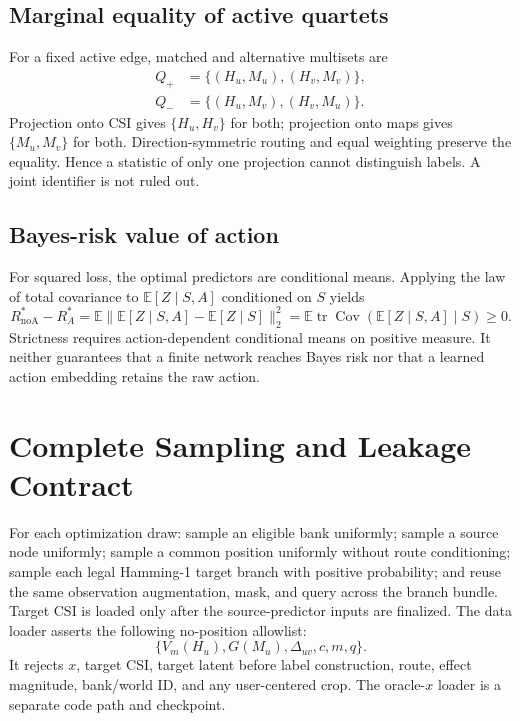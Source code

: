 \documentclass{article}
\newcommand{\csi}{H}
\newcommand{\map}{M}
\newcommand{\E}{\mathbb{E}}
\begin{document}
\subsection{Marginal equality of active quartets}
For a fixed active edge, matched and alternative multisets are
\begin{align*}
Q_+&=\{(\csi_u,\map_u),(\csi_v,\map_v)\},\\
Q_-&=\{(\csi_u,\map_v),(\csi_v,\map_u)\}.
\end{align*}
Projection onto CSI gives $\{\csi_u,\csi_v\}$ for both; projection onto maps
gives $\{\map_u,\map_v\}$ for both.  Direction-symmetric routing and equal
weighting preserve the equality.  Hence a statistic of only one projection
cannot distinguish labels.  A joint identifier is not ruled out.

\subsection{Bayes-risk value of action}
For squared loss, the optimal predictors are conditional means.  Applying the
law of total covariance to $\E[Z\mid S,A]$ conditioned on $S$ yields
\begin{equation*}
 R_{\mathrm{noA}}^*-R_A^*
 =\E\|\E[Z\mid S,A]-\E[Z\mid S]\|_2^2
 =\E\operatorname{tr}\operatorname{Cov}(\E[Z\mid S,A]\mid S)\ge0.
\end{equation*}
Strictness requires action-dependent conditional means on positive measure.
It neither guarantees that a finite network reaches Bayes risk nor that a
learned action embedding retains the raw action.

\section{Complete Sampling and Leakage Contract}

For each optimization draw: sample an eligible bank uniformly; sample a source
node uniformly; sample a common position uniformly without route conditioning;
sample each legal Hamming-1 target branch with positive probability; and reuse
the same observation augmentation, mask, and query across the branch bundle.
Target CSI is loaded only after the source-predictor inputs are finalized.  The
data loader asserts the following no-position allowlist:
\begin{equation*}
\{V_m(\csi_u),G(\map_u),\Delta_{uv},c,m,q\}.
\end{equation*}
It rejects $x$, target CSI, target latent before label construction, route,
effect magnitude, bank/world ID, and any user-centered crop.  The oracle-$x$
loader is a separate code path and checkpoint.
\end{document}
